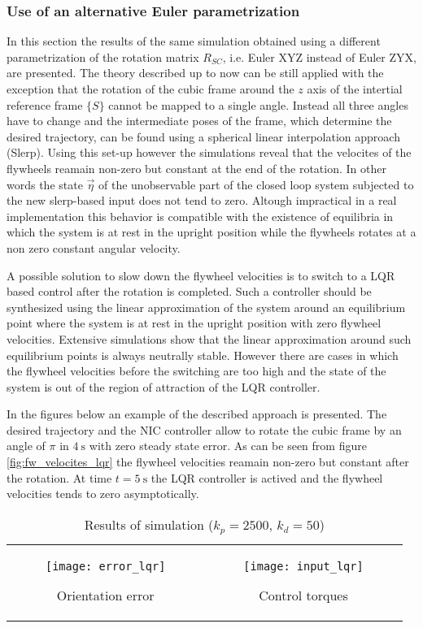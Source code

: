 \subsubsection{Use of an alternative Euler parametrization}
In this section the results of the same simulation obtained using a different parametrization of the rotation matrix
$R_{SC}$, i.e. Euler XYZ instead of Euler ZYX, are presented. The theory described up to now
can be still applied with the exception that the rotation of the cubic frame around the $z$ axis
of the intertial reference frame $\{S\}$ cannot be mapped to a single angle. Instead all three angles
have to change and the intermediate poses of the frame, which determine the desired trajectory, can be found 
using a spherical linear interpolation approach (Slerp). Using this set-up however the simulations reveal that
the velocites of the flywheels reamain non-zero but constant at the end of the rotation. In other words
the state $\vec{\eta}$ of the unobservable part of the closed loop system subjected to the new slerp-based input does not
tend to zero. Altough impractical in a real implementation this behavior is compatible with the existence of
equilibria in which the system is at rest in the upright position while the flywheels rotates at a non zero constant angular velocity.
\par
A possible solution to slow down the flywheel velocities is to switch to a LQR based control after the rotation
is completed. Such a controller should be synthesized using the linear approximation of the system around an equilibrium
point where the system is at rest in the upright position with zero flywheel velocities. Extensive simulations show that
the linear approximation around such equilibrium points is always neutrally stable. However there are cases in which
the flywheel velocities before the switching are too high and the state of the system is out of the region
of attraction of the LQR controller.
\par
In the figures below an example of the described approach is presented.
The desired trajectory and the NIC controller allow to rotate the cubic frame
by an angle of $\pi$ in $\SI{4}{\second}$ with zero steady state error. As can be
seen from figure \ref{fig:fw_velocites_lqr} the flywheel velocities reamain non-zero
but constant after the rotation. At time $t=\SI{5}{\second}$ the LQR controller is
actived and the flywheel velocities tends to zero asymptotically.
\begin{table}[h]
  \begin{tabular}{cc}
    \begin{subfigure}{0.5\textwidth}
      \centering
      \texttt{[image: error\_lqr]}
      \caption{Orientation error \label{fig:orientation_error_lqr}}
    \end{subfigure}&
    \begin{subfigure}{0.5\textwidth}
      \centering
      \texttt{[image: input\_lqr]}
      \caption{Control torques \label{fig:requested_torques_lqr}}
    \end{subfigure}
  \end{tabular}
  \caption{Results of simulation ($k_p = 2500$, $k_d = 50$)}
\end{table}
